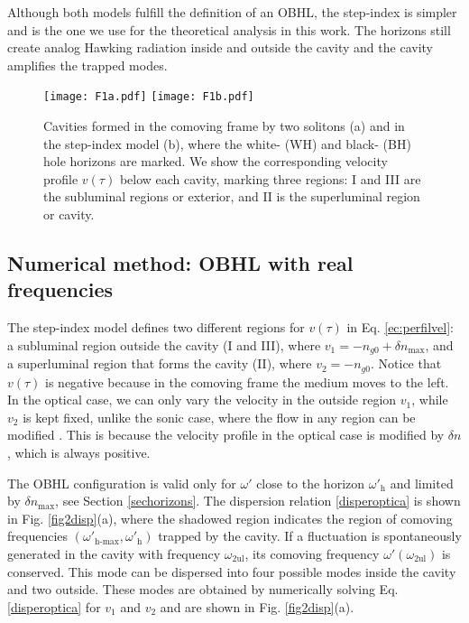 \documentclass[aps,pra,reprint,amsmath,amssymb,showpacs,groupedaddress,floatfix]{revtex4-1}
\begin{document}
Although both models fulfill the definition of an OBHL, the step-index is simpler and is the one we use for the theoretical analysis in this work. The horizons still create analog Hawking radiation inside and outside the cavity and the cavity amplifies the trapped modes.

\begin{figure}
	\centering
	\texttt{[image: F1a.pdf]}\hspace{1mm}
	\texttt{[image: F1b.pdf]}
	\caption{Cavities formed in the comoving frame by two solitons (a) and in the step-index model (b), where the white- (WH) and black- (BH) hole horizons are marked. We show the corresponding velocity profile $v(\tau)$ below each cavity, marking three regions: I and III are the subluminal regions or exterior, and II is the superluminal region or cavity.} 
	\label{fig1diagram}
\end{figure}

\subsection{Numerical method: OBHL with real frequencies}
The step-index model defines two different regions for $v(\tau)$ in Eq. \eqref{ec:perfilvel}: a subluminal region outside the cavity (I and III), where $v_1=-n_{g0}+\delta n_\text{max}$, and a superluminal region that forms the cavity (II), where $v_2=-n_{g0}$. Notice that $v(\tau)$ is negative because in the comoving frame the medium moves to the left. In the optical case, we can only vary the velocity in the outside region $v_1$, while $v_2$ is kept fixed, unlike the sonic case, where the flow in any region can be modified \cite{Leonhardt2007}. This is because the velocity profile in the optical case is modified by $\delta n$, which is always positive.

The OBHL configuration is valid only for $\omega'$ close to the horizon $\omega'_\text{h}$ and limited by $\delta n_\text{max}$, see Section \ref{sechorizons}. The dispersion relation \eqref{disperoptica} is shown in Fig. \ref{fig2disp}(a), where the shadowed region indicates the region of comoving frequencies $(\omega'_\text{h-max},\omega'_\text{h})$ trapped by the cavity. If a fluctuation is spontaneously generated in the cavity with frequency $\omega_{\text{2ul}}$, its comoving frequency $\omega'(\omega_{\text{2ul}})$ is conserved. This mode can be dispersed into four possible modes inside the cavity and two outside. These modes are  obtained by numerically solving Eq. \eqref{disperoptica} for $v_1$ and $v_2$  and  are shown in Fig. \ref{fig2disp}(a).
\end{document}
